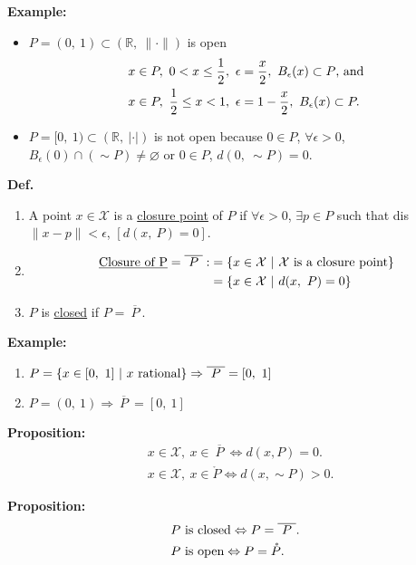 \documentclass[letterpaper]{article}
\newcommand{\real}{\mathbb R}  %
\begin{document}
\noindent \textbf{Example:}
    \begin{itemize}
        \item $P=(0,\ 1)\subset(\real,\ \|\cdot\|)$ is open
            \begin{align*}
                x&\in P,\ 0<x\leq\frac{1}{2},\ \epsilon=\frac{x}{2},\ B_\epsilon(x)\subset P\textnormal{, and}\\
                x&\in P,\ \frac{1}{2}\leq x<1,\ \epsilon=1-\frac{x}{2},\ B_\epsilon(x)\subset P.
            \end{align*}
        \item $P=[0,\ 1)\subset(\real,\ |\cdot|)$ is not open because $0\in P$, $\forall\epsilon>0$, $B_\epsilon(0)\cap(\sim P)\neq\varnothing$ or $0\in P$, $d(0,\ \sim P)=0$.
    \end{itemize}

\noindent \textbf{Def.}
    \begin{enumerate}
        \item A point $x\in \mathcal{X}$ is a \underline{closure point} of $P$ if $\forall\epsilon>0$, $\exists p\in P$ such that dis$\|x-p\|<\epsilon$, $[d(x,\ P)=0]$.
        \item \begin{align*}
                \textnormal{\underline{Closure of P}}=\overline{~P~}:&=\{x\in\mathcal{X}\ |\ \mathcal{X}\textnormal{ is a closure point}\}\\
                &=\{x\in\mathcal{X}\ |\ d(x,\ P)=0\}
            \end{align*}
        \item $P$ is \underline{closed} if $P=\overline{~P~}$.
    \end{enumerate}

\noindent \textbf{Example:}
    \begin{enumerate}
        \item $P=\{x\in[0,\ 1]\ |\ x\textnormal{ rational}\}\Rightarrow\overline{~P~}=[0,\ 1]$
        \item $P=(0,\ 1)\Rightarrow\overline{~P~}=[0,\ 1]$
    \end{enumerate}

\noindent \textbf{Proposition:}
    \begin{align*}
        &x\in\mathcal{X},\ x\in\overline{~P~}\Leftrightarrow d(x,P)=0.\\
        &x\in\mathcal{X},\ x\in\mathring{P}\Leftrightarrow d(x,\sim P)>0.
    \end{align*}

\noindent \textbf{Proposition:}
    \begin{align*}
        &P\textnormal{ is closed}\Leftrightarrow P=\overline{~P~}.\\
        &P\textnormal{ is open}\Leftrightarrow P=\mathring{P}.
    \end{align*}
\end{document}
